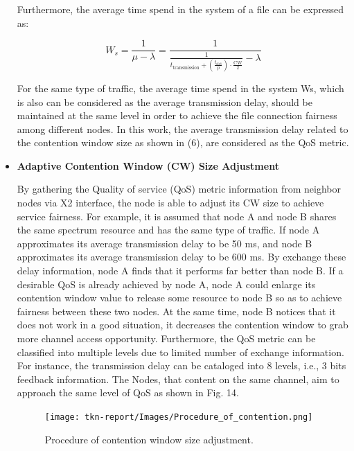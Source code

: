 \documentclass{IEEEtran}
\begin{document}
\begin{itemize}
    Furthermore, the average time spend in the system of a file can be expressed as: 
    
    \begin{equation*}W_{s}=\frac{1}{\mu-\lambda}=\frac{1}{\frac{1}{t_{\text{transmission}}+(\frac{t_{\text{slot}}}{p})\cdot\frac{\text{CW}}{2}}-\lambda}\tag{6}\end{equation*}
    
    
    For the same type of traffic, the average time spend in the system Ws, which is also can be considered as the average transmission delay, should be maintained at the same level in order to achieve the file connection fairness among different nodes. In this work, the average transmission delay related to the contention window size as shown in (6), are considered as the QoS metric.
   \cite{Tao2015}
    \bigskip
    
    \item\textbf{Adaptive Contention Window (CW) Size Adjustment}  
    
        By gathering the Quality of service (QoS) metric information from neighbor nodes via X2 interface, the node is able to adjust its CW size to achieve service fairness. For example, it is assumed that node A and node B shares the same spectrum resource and has the same type of traffic. If node A approximates its average transmission delay to be 50 ms, and node B approximates its average transmission delay to be 600 ms. By exchange these delay information, node A finds that it performs far better than node B. If a desirable QoS is already achieved by node A, node A could enlarge its contention window value to release some resource to node B so as to achieve fairness between these two nodes. At the same time, node B notices that it does not work in a good situation, it decreases the contention window to grab more channel access opportunity. Furthermore, the QoS metric can be classified into multiple levels due to limited number of exchange information. For instance, the transmission delay can be cataloged into 8 levels, i.e., 3 bits feedback information. The Nodes, that content on the same channel, aim to approach the same level of QoS as shown in Fig. 14. 
    
    
  
\graphicspath{{Images/}}
\maketitle
\begin{figure}[htp]
\centering
\texttt{[image: tkn-report/Images/Procedure\_of\_contention.png]}
\caption{Procedure of contention window size adjustment.}
\label{fig:lion}
\end{figure}
    

\end{itemize}
\end{document}
